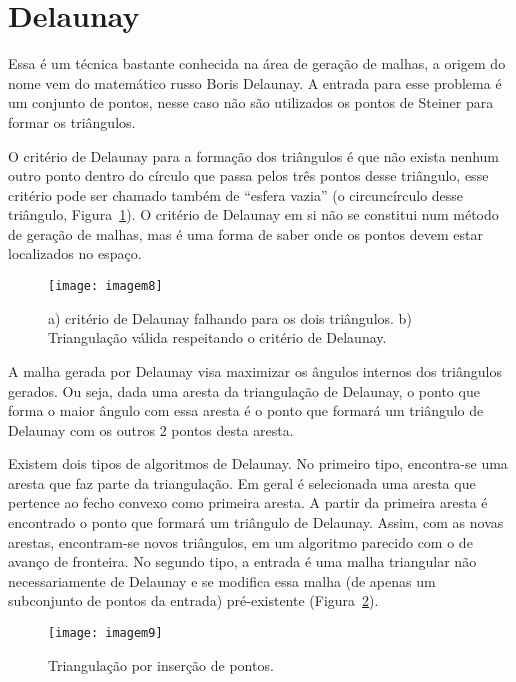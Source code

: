 \section{Delaunay}

Essa é um técnica bastante conhecida na área de geração de malhas, a origem do nome vem do matemático russo Boris Delaunay. A entrada para esse problema é um conjunto de pontos, nesse caso não são utilizados os pontos de Steiner para formar os triângulos.

O critério de Delaunay para a formação dos triângulos é que não exista nenhum outro ponto dentro do círculo que passa pelos três pontos desse triângulo, esse critério pode ser chamado também de “esfera vazia” (o circuncírculo desse triângulo, Figura~\ref{fig:imagem8}). O critério de Delaunay em si não se constitui num método de geração de malhas, mas é uma forma de saber onde os pontos devem estar localizados no espaço.

 \begin{figure}[htbp]
     \centering
     \texttt{[image: imagem8]}
     \caption{a) critério de Delaunay falhando para os dois triângulos. b) Triangulação válida respeitando o critério de Delaunay.} 
     \label{fig:imagem8}
 \end{figure}

A malha gerada por Delaunay visa maximizar os ângulos internos dos triângulos gerados. Ou seja, dada uma aresta da triangulação de Delaunay, o ponto que forma o maior ângulo com essa aresta é o ponto que formará um triângulo de Delaunay com os outros 2 pontos desta aresta.

Existem dois tipos de algoritmos de Delaunay. No primeiro tipo, encontra-se uma aresta que faz parte da triangulação. Em geral é selecionada uma aresta que pertence ao fecho convexo como primeira aresta. A partir da primeira aresta é encontrado o ponto que formará um triângulo de Delaunay. Assim, com as novas arestas, encontram-se novos triângulos, em um algoritmo parecido com o de avanço de fronteira. No segundo tipo, a entrada é uma malha triangular não necessariamente de Delaunay e se modifica essa malha (de apenas um subconjunto de pontos da entrada) pré-existente (Figura~\ref{fig:imagem9}).

 \begin{figure}[htbp]
     \centering
     \texttt{[image: imagem9]}
     \caption{Triangulação por inserção de pontos. \cite{bib:Freitas10}} 
     \label{fig:imagem9}
 \end{figure}

